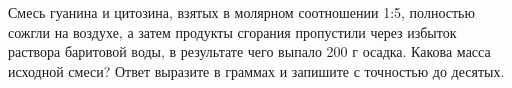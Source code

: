 
Смесь гуанина и цитозина, взятых в молярном соотношении 1:5, полностью сожгли на воздухе, а затем продукты сгорания пропустили через избыток раствора баритовой воды, в результате чего выпало 200 г осадка. Какова масса исходной смеси? Ответ выразите в граммах и запишите с точностью до десятых.

